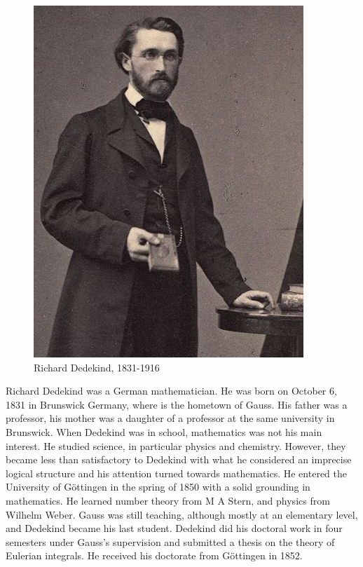 \documentclass{article}
\begin{document}
\begin{figure}
 \centering
 \includegraphics[scale=0.35]{img/Dedekind.jpg}
 \captionsetup{labelformat=empty}
 \caption{Richard Dedekind, 1831-1916}
 \label{fig:Dedekind}
\end{figure}

Richard Dedekind was a German mathematician. He was born on October 6, 1831 in Brunswick Germany, where is the hometown of Gauss. His father was a professor, his mother was a daughter of a professor at the same university in Brunswick. When Dedekind was in school, mathematics was not his main interest. He studied science, in particular physics and chemistry. However, they became less than satisfactory to Dedekind with what he considered an imprecise logical structure and his attention turned towards mathematics. He entered the University of Göttingen in the spring of 1850 with a solid grounding in mathematics. He learned number theory from M A Stern, and physics from Wilhelm Weber. Gauss was still teaching, although mostly at an elementary level, and Dedekind became his last student. Dedekind did his doctoral work in four semesters under Gauss's supervision and submitted a thesis on the theory of Eulerian integrals. He received his doctorate from Göttingen in 1852.
\end{document}
